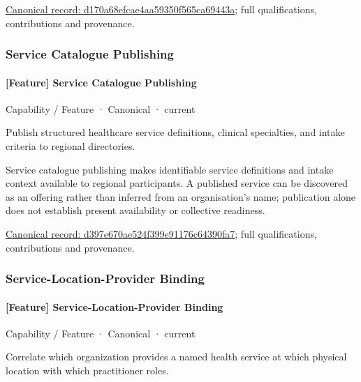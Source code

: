 {\footnotesize \href{../../../../continuum/strategy/capability/feature/d170a68efcae4aa59350f565ca69443a.md}{Canonical record: d170a68efcae4aa59350f565ca69443a}; full qualifications, contributions and provenance.}\par
\subsubsection{Service Catalogue Publishing}

\paragraph{[Feature] Service Catalogue Publishing}

\label{element:d397e670ae524f399e91176c64390fa7}
{\small Capability / Feature · Canonical · current}\par

Publish structured healthcare service definitions, clinical specialties, and intake criteria to regional directories.



Service catalogue publishing makes identifiable service definitions and intake context available to regional participants. A published service can be discovered as an offering rather than inferred from an organisation's name; publication alone does not establish present availability or collective readiness.


{\footnotesize \href{../../../../continuum/strategy/capability/feature/d397e670ae524f399e91176c64390fa7.md}{Canonical record: d397e670ae524f399e91176c64390fa7}; full qualifications, contributions and provenance.}\par
\subsubsection{Service-Location-Provider Binding}

\paragraph{[Feature] Service-Location-Provider Binding}

\label{element:37188bb916244f41b1b7d988ad52a2eb}
{\small Capability / Feature · Canonical · current}\par

Correlate which organization provides a named health service at which physical location with which practitioner roles.



